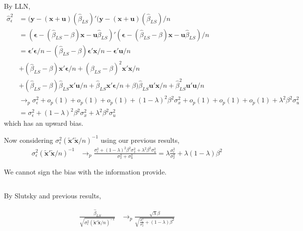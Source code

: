 \documentclass[12pt]{article}
\begin{document}
By LLN,
\begin{equation}
\begin{split}
\hat{\sigma}_\epsilon^2 & = (\mathbf{y - (x+u)}(\hat{\beta}_{LS} )' (\mathbf{y - (x+u)}(\hat{\beta}_{LS} )/n \\
& = (\mathbf{\epsilon} - (\hat{\beta}_{LS} - \beta)\mathbf{x} - \mathbf{u}\hat{\beta}_{LS})'(\mathbf{\epsilon} - (\hat{\beta}_{LS} - \beta)\mathbf{x} - \mathbf{u}\hat{\beta}_{LS})/n\\
&= \mathbf{\epsilon}'\mathbf{\epsilon}/n - (\hat{\beta}_{LS} - \beta)\mathbf{\epsilon}'\mathbf{x}/n -\mathbf{\epsilon}'\mathbf{u}/n \\
&+ (\hat{\beta}_{LS} - \beta)\mathbf{x}'\mathbf{\epsilon}/n + (\hat{\beta}_{LS} - \beta)^2\mathbf{x}'\mathbf{x}/n  \\
&+ (\hat{\beta}_{LS} - \beta)\hat{\beta}_{LS}\mathbf{x}'\mathbf{u}/n+\hat{\beta}_{LS}\mathbf{x}'\mathbf{\epsilon}/n + \beta)\hat{\beta}_{LS}\mathbf{u}'\mathbf{x}/n +\hat{\beta}_{LS}^2\mathbf{u}'\mathbf{u}/n \\
&\rightarrow_p \sigma_\epsilon^2 +o_p(1) + o_p(1) + o_p(1) +(1-\lambda)^2\beta^2\sigma_x^2+o_p(1)+o_p(1)+o_p(1)+\lambda^2\beta^2\sigma_u^2\\
&=  \sigma_\epsilon^2 +(1-\lambda)^2\beta^2\sigma_x^2+\lambda^2\beta^2\sigma_u^2
 \end{split}
 \end{equation}
 which has an upward bias.


Now considering $\sigma_\epsilon^2(\mathbf{\tilde{x}'\tilde{x}}/n)^{-1}$ using our previous results,
\begin{equation}
\begin{split}
\sigma_\epsilon^2(\mathbf{\tilde{x}'\tilde{x}}/n)^{-1} &\rightarrow_p  \frac{\sigma_\epsilon^2 +(1-\lambda)^2\beta^2\sigma_x^2+\lambda^2\beta^2\sigma_u^2}{\sigma_x^2+\sigma_u^2} = \lambda\frac{\sigma_\epsilon^2}{\sigma_x^2} + \lambda(1-\lambda)\beta^2
 \end{split}
 \end{equation}

We cannot sign the bias with the information provide.
\newpage
\subsection{}


By Slutsky and previous results,

\begin{equation}
\begin{split}
\frac{\hat{\beta}_{LS}}{\sqrt{\sigma_\epsilon^2(\mathbf{\tilde{x}'\tilde{x}}/n)^{-1}}} &\rightarrow_p \frac{\sqrt\lambda\beta}{\sqrt{\frac{\sigma_\epsilon^2}{\sigma_x^2} + (1-\lambda)\beta^2}}
 \end{split}
 \end{equation}
\end{document}
